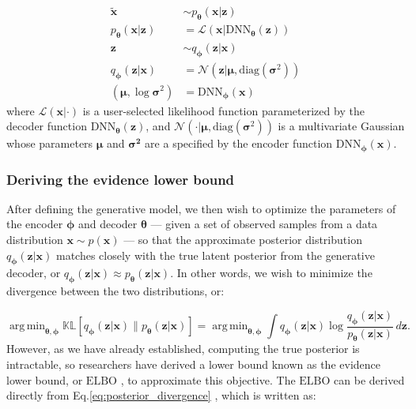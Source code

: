 \documentclass[11pt,a4paper,oneside]{book}
\DeclareMathOperator*{\argmin}{arg\,min}
\begin{document}
\begin{appendices}
\begin{subequations}
\begin{align}
    \tilde{\mathbf{x}} &\sim
    p_{\boldsymbol{\theta}}(\mathbf{x} | \mathbf{z}) \label{eq:recon}\\
    p_{\boldsymbol{\theta}}(\mathbf{x} | \mathbf{z}) &= \mathcal{L} \left( \mathbf{x} | \mathrm{DNN}_{\boldsymbol{\theta}}(\mathbf{z}) \right) \label{eq:likelihood}\\
    \mathbf{z} &\sim
    q_{\boldsymbol{\phi}}(\mathbf{z} | \mathbf{x})\label{eq:sample}\\
    q_{\boldsymbol{\phi}}(\mathbf{z} | \mathbf{x}) &= \mathcal{N}(\mathbf{z} | \boldsymbol{\mu}, \mathrm{diag}(\boldsymbol{\sigma}^2)) \label{eq:approx}\\
    (\boldsymbol{\mu}, \log \boldsymbol{\sigma}^2) &= \mathrm{DNN}_{\boldsymbol{\phi}}(\mathbf{x})\label{eq:encoder}
\end{align}
\end{subequations}
where $\mathcal{L}(\mathbf{x}| \cdot)$ is a user-selected likelihood function parameterized by the decoder function $\mathrm{DNN}_{\boldsymbol{\theta}}(\mathbf{z})$, and $\mathcal{N}(\cdot | \boldsymbol{\mu}, \mathrm{diag}(\boldsymbol{\sigma}^2))$ is a multivariate Gaussian whose parameters $\boldsymbol{\mu}$ and $\boldsymbol{\boldsymbol{\sigma}^2}$ are a specified by the encoder function $\mathrm{DNN}_{\boldsymbol{\phi}}(\mathbf{x})$. 

\subsubsection{Deriving the evidence lower bound}
\label{appendix:elbo}
After defining the generative model, we then wish to optimize the parameters of the encoder $\boldsymbol{\phi}$ and decoder $\boldsymbol{\theta}$ --- given a set of observed samples from a data distribution $\mathbf{x} \sim p(\mathbf{x})$ --- so that the approximate posterior distribution $q_{\boldsymbol{\phi}}(\mathbf{z} | \mathbf{x})$ matches closely with the true latent posterior from the generative decoder, or $q_{\boldsymbol{\phi}}(\mathbf{z} | \mathbf{x}) \approx p_{\boldsymbol{\theta}}(\mathbf{z} | \mathbf{x})$. In other words, we wish to minimize the divergence between the two distributions, or:

\begin{equation}
    \label{eq:posterior_divergence}
    \argmin_{\boldsymbol{\theta}, \boldsymbol{\phi}} \mathbb{KL}[q_{\boldsymbol{\phi}}(\mathbf{z} | \mathbf{x}) \| p_{\boldsymbol{\theta}}(\mathbf{z} | \mathbf{x})] = \argmin_{\boldsymbol{\theta}, \boldsymbol{\phi}} \int q_{\boldsymbol{\phi}}(\mathbf{z} | \mathbf{x}) \log \frac{q_{\boldsymbol{\phi}}(\mathbf{z} | \mathbf{x})}{p_{\boldsymbol{\theta}}(\mathbf{z} | \mathbf{x})} \, d{\mathbf{z}}.
\end{equation}
However, as we have already established, computing the true posterior is intractable, so researchers have derived a lower bound known as the evidence lower bound, or $\mathrm{ELBO}$ \citep{kingma2013vae}, to approximate this objective. The $\mathrm{ELBO}$ can be derived directly from Eq.\ref{eq:posterior_divergence} \citep{adams2020}, which is written as:


\end{appendices}
\end{document}
